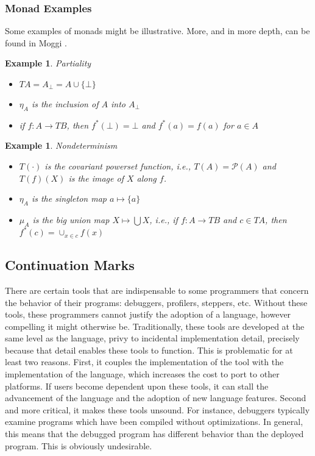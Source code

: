 \documentclass[ms]{byuprop}
\newcounter{example}
\begin{document}
\subsubsection{Monad Examples}

Some examples of monads might be illustrative. More, and in more depth, can be found in 
Moggi \cite{moggi1991notions}.

\newtheorem{partiality}[example]{Example}

\begin{partiality}
Partiality

\begin{itemize}
\item $TA=A_{\bot}=A\cup \{\bot\}$
\item $\eta_{A}$ is the inclusion of $A$ into $A_{\bot}$
\item if $f:A\rightarrow TB$, then $f^{*}(\bot)=\bot$ and $f^{*}(a)=f(a)$ for $a\in A$
\end{itemize}
\end{partiality}

\newtheorem{nondeterminism}[example]{Example}

\begin{nondeterminism}
Nondeterminism

\begin{itemize}
\item $T(\cdot)$ is the covariant powerset function, i.e., $T(A)=\mathcal{P}(A)$ and 
$T(f)(X)$ is the image of $X$ along $f$.
\item $\eta_{A}$ is the singleton map $a\mapsto \{a\}$
\item $\mu_{A}$ is the big union map $X\mapsto\bigcup X$, i.e., if $f:A\rightarrow TB$ and $c\in TA$, then $f^{*}(c)=\cup_{x\in c}f(x)$
\end{itemize}
\end{nondeterminism}

\subsection{Continuation Marks}

There are certain tools that are indispensable to some programmers that concern the
behavior of their programs: debuggers, profilers, steppers, etc. Without these tools,
these programmers cannot justify the adoption of a language, however compelling it might
otherwise be. Traditionally, these tools are developed at the same level as the 
language, privy to incidental implementation detail, precisely because that detail 
enables these tools to function. This is problematic for at least two reasons. First, 
it couples the implementation of the tool with the implementation of the language, which
increases the cost to port to other platforms. If users become dependent upon these tools,
it can stall the advancement of the language and the adoption of new language features.
Second and more critical, it makes these tools unsound. For instance, debuggers typically
examine programs which have been compiled without optimizations. In general, this means 
that the debugged program has different behavior than the deployed program. This is 
obviously undesirable.
\end{document}
